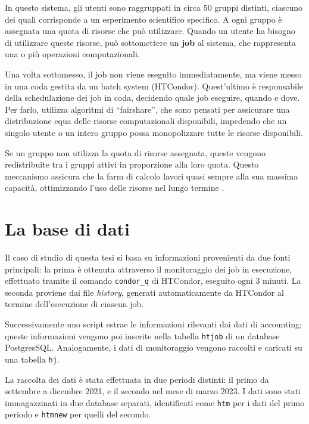 In questo sistema, gli utenti sono raggruppati in circa 50 gruppi distinti,
ciascuno dei quali corrisponde a un esperimento scientifico specifico. A ogni
gruppo è assegnata una quota di risorse che può utilizzare. Quando un utente
ha bisogno di utilizzare queste risorse, può sottomettere un \textbf{job} al
sistema, che rappresenta una o più operazioni computazionali.

Una volta sottomesso, il job non viene eseguito immediatamente, ma viene messo
in una coda gestita da un batch system (HTCondor). Quest'ultimo è responsabile
della schedulazione dei job in coda, decidendo quale job eseguire, quando e
dove. Per farlo, utilizza algoritmi di ``fairshare'', che sono pensati per
assicurare una distribuzione equa delle risorse computazionali disponibili,
impedendo che un singolo utente o un intero gruppo possa monopolizzare tutte
le risorse disponibili.

Se un gruppo non utilizza la quota di risorse assegnata, queste vengono
redistribuite tra i gruppi attivi in proporzione alla loro quota. Questo
meccanismo assicura che la farm di calcolo lavori quasi sempre alla sua
massima capacità, ottimizzando l'uso delle risorse nel lungo termine
\cite{cnaf_calcolo}.

\section{La base di dati}

Il caso di studio di questa tesi si basa su informazioni provenienti da due
fonti principali: la prima è ottenuta attraverso il monitoraggio dei job in
esecuzione, effettuato tramite il comando \texttt{condor\_q} di HTCondor,
eseguito ogni 3 minuti. La seconda proviene dai file \textit{history},
generati automaticamente da HTCondor al termine dell'esecuzione di ciascun
job.

Successivamente uno script estrae le informazioni rilevanti dai dati di
accounting; queste informazioni vengono poi inserite nella tabella
\texttt{htjob} di un database PostgresSQL. Analogamente, i dati di
monitoraggio vengono raccolti e caricati su una tabella \texttt{hj}.

La raccolta dei dati è stata effettuata in due periodi distinti: il primo da
settembre a dicembre 2021, e il secondo nel mese di marzo 2023. I dati sono
stati immagazzinati in due database separati, identificati come \texttt{htm}
per i dati del primo periodo e \texttt{htmnew} per quelli del secondo.

